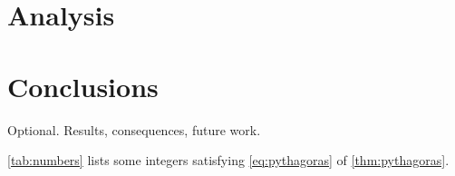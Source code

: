 \documentclass[a4paper, article, oneside, UKenglish]{memoir}
\newcommand{\0}{\mathbf{0}}
\newcommand{\1}{\mathbf{1}}
\begin{document}
\chapter{Analysis}

\chapter{Conclusions}


Optional. Results, consequences, future work.

\cref{tab:numbers} lists some integers satisfying \cref{eq:pythagoras} of \cref{thm:pythagoras}.




\printbibliography
\end{document}
